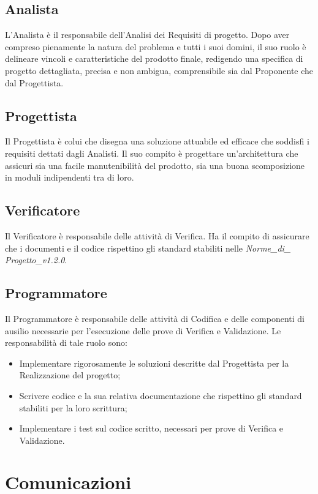 \subsection{Analista}
\label{2.3}
L'Analista è il responsabile dell'Analisi dei Requisiti di progetto. Dopo aver compreso pienamente la natura del problema e tutti i suoi domini, il suo ruolo è delineare vincoli e caratteristiche del prodotto finale, redigendo una specifica di progetto dettagliata, precisa e non ambigua, comprensibile sia dal Proponente che dal Progettista.

\subsection{Progettista}
\label{2.4}
Il Progettista è colui che disegna una soluzione attuabile ed efficace che soddisfi i requisiti dettati dagli Analisti. Il suo compito è progettare un'architettura che assicuri sia una facile manutenibilità del prodotto, sia una buona scomposizione in moduli indipendenti tra di loro.

\subsection{Verificatore}
\label{2.5}
Il Verificatore è responsabile delle attività di Verifica. Ha il compito di assicurare che i documenti e il codice rispettino gli standard stabiliti nelle \emph{Norme_di_ Progetto_v1.2.0}.

\subsection{Programmatore}
\label{2.6}
Il Programmatore è responsabile delle attività di Codifica e delle componenti di ausilio
necessarie per l'esecuzione delle prove di Verifica e Validazione. Le responsabilità di tale ruolo sono:
\begin{itemize}
\item Implementare rigorosamente le soluzioni descritte dal Progettista per la Realizzazione del progetto;
\item Scrivere codice e la sua relativa documentazione che rispettino gli standard stabiliti per la loro scrittura;
\item Implementare i test sul codice scritto, necessari per prove di Verifica e Validazione.
\end{itemize}

\newpage
\section{Comunicazioni}
\label{3.0}

